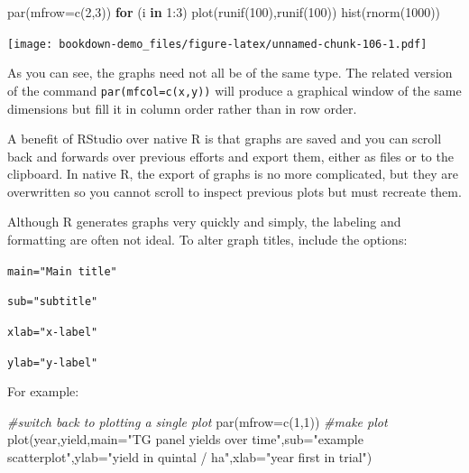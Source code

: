 \documentclass[
]{book}
\newenvironment{Shaded}{\begin{snugshade}}{\end{snugshade}}
\newcommand{\AttributeTok}[1]{\textcolor[rgb]{0.77,0.63,0.00}{#1}}
\newcommand{\CommentTok}[1]{\textcolor[rgb]{0.56,0.35,0.01}{\textit{#1}}}
\newcommand{\ControlFlowTok}[1]{\textcolor[rgb]{0.13,0.29,0.53}{\textbf{#1}}}
\newcommand{\DecValTok}[1]{\textcolor[rgb]{0.00,0.00,0.81}{#1}}
\newcommand{\FunctionTok}[1]{\textcolor[rgb]{0.00,0.00,0.00}{#1}}
\newcommand{\NormalTok}[1]{#1}
\newcommand{\SpecialCharTok}[1]{\textcolor[rgb]{0.00,0.00,0.00}{#1}}
\newcommand{\StringTok}[1]{\textcolor[rgb]{0.31,0.60,0.02}{#1}}
\begin{document}
\begin{Shaded}
\begin{Highlighting}[]
\FunctionTok{par}\NormalTok{(}\AttributeTok{mfrow=}\FunctionTok{c}\NormalTok{(}\DecValTok{2}\NormalTok{,}\DecValTok{3}\NormalTok{))}
\ControlFlowTok{for}\NormalTok{ (i }\ControlFlowTok{in} \DecValTok{1}\SpecialCharTok{:}\DecValTok{3}\NormalTok{) }\FunctionTok{plot}\NormalTok{(}\FunctionTok{runif}\NormalTok{(}\DecValTok{100}\NormalTok{),}\FunctionTok{runif}\NormalTok{(}\DecValTok{100}\NormalTok{))}
\FunctionTok{hist}\NormalTok{(}\FunctionTok{rnorm}\NormalTok{(}\DecValTok{1000}\NormalTok{))}
\end{Highlighting}
\end{Shaded}

\texttt{[image: bookdown-demo\_files/figure-latex/unnamed-chunk-106-1.pdf]}

As you can see, the graphs need not all be of the same type. The related version of the command \texttt{par(mfcol=c(x,y))} will produce a graphical window of the same dimensions but fill it in column order rather than in row order.

A benefit of RStudio over native R is that graphs are saved and you can scroll back and forwards over previous efforts and export them, either as files or to the clipboard. In native R, the export of graphs is no more complicated, but they are overwritten so you cannot scroll to inspect previous plots but must recreate them.

Although R generates graphs very quickly and simply, the labeling and formatting are often not ideal. To alter graph titles, include the options:

\texttt{main="Main\ title"}

\texttt{sub="subtitle"}

\texttt{xlab="x-label"}

\texttt{ylab="y-label"}

For example:

\begin{Shaded}
\begin{Highlighting}[]
\CommentTok{\#switch back to plotting a single plot}
\FunctionTok{par}\NormalTok{(}\AttributeTok{mfrow=}\FunctionTok{c}\NormalTok{(}\DecValTok{1}\NormalTok{,}\DecValTok{1}\NormalTok{))}
\CommentTok{\#make plot}
\FunctionTok{plot}\NormalTok{(year,yield,}\AttributeTok{main=}\StringTok{"TG panel yields over time"}\NormalTok{,}\AttributeTok{sub=}\StringTok{"example scatterplot"}\NormalTok{,}\AttributeTok{ylab=}\StringTok{"yield in quintal / ha"}\NormalTok{,}\AttributeTok{xlab=}\StringTok{"year first in trial"}\NormalTok{)}
\end{Highlighting}
\end{Shaded}
\end{document}
